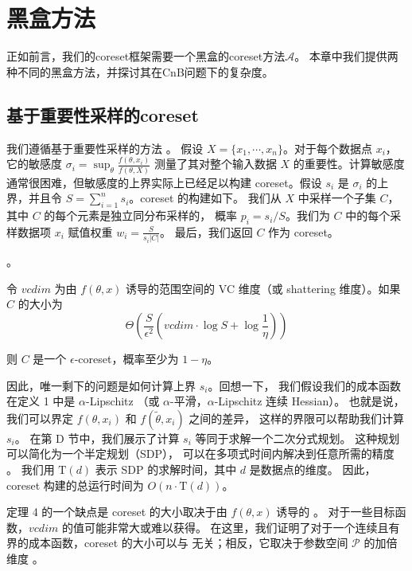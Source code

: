 \chapter{黑盒方法}

正如前言，我们的coreset框架需要一个黑盒的coreset方法$\mathcal{A}$。
本章中我们提供两种不同的黑盒方法，并探讨其在CnB问题下的复杂度。

\section{基于重要性采样的coreset}

我们遵循基于重要性采样的方法 \citep{LS10}。
假设 $X = \{x_1, \cdots, x_n\}$。对于每个数据点 $x_i$，
它的敏感度 $\sigma_i = \sup_\theta \frac{f(\theta, x_i)}{f(\theta, X)}$ 
测量了其对整个输入数据 $X$ 的重要性。计算敏感度通常很困难，但敏感度的上界实际上已经足以构建 
coreset。假设 $s_i$ 是 $\sigma_i$ 的上界，并且令 $S = \sum_{i=1}^n s_i$。coreset 的构建如下。
我们从 $X$ 中采样一个子集 $C$，其中 $C$ 的每个元素是独立同分布采样的，
概率 $p_i = s_i / S$。我们为 $C$ 中的每个采样数据项 $x_i$ 赋值权重 $w_i = \frac{S}{s_i |C|}$。
最后，我们返回 $C$ 作为 coreset。


\begin{theorem}。

令 $vcdim$ 为由 $f(\theta, x)$ 诱导的范围空间的 VC 维度（或 shattering 维度）。如果 $C$ 的大小为
\begin{equation}
\Theta \left( \frac{S}{\epsilon^2} \left( vcdim \cdot \log S + \log \frac{1}{\eta} \right) \right)
\end{equation}

则 $C$ 是一个 $\epsilon$-coreset，概率至少为 $1 - \eta$。
\end{theorem}

因此，唯一剩下的问题是如何计算上界 $s_i$。回想一下，
我们假设我们的成本函数在定义 1 中是 $\alpha$-Lipschitz
（或 $\alpha$-平滑，$\alpha$-Lipschitz 连续 Hessian）。
也就是说，我们可以界定 $f(\theta, x_i)$ 和 $f(\tilde{\theta}, x_i)$ 之间的差异，
这样的界限可以帮助我们计算 $s_i$。
在第 D 节中，我们展示了计算 $s_i$ 等同于求解一个二次分式规划。
这种规划可以简化为一个半定规划（SDP）\citep{BT09}，
可以在多项式时间内解决到任意所需的精度 \citep{GM12}。
我们用 $\text{T}(d)$ 表示 SDP 的求解时间，其中 $d$ 是数据点的维度。
因此，coreset 构建的总运行时间为 $O(n \cdot \text{T}(d))$。

定理 4 的一个缺点是 coreset 的大小取决于由 $f(\theta, x)$ 诱导的 。
对于一些目标函数，$vcdim$ 的值可能非常大或难以获得。
在这里，我们证明了对于一个连续且有界的成本函数，coreset 的大小可以与 无关；相反，它取决于参数空间 $\mathcal{P}$ 的加倍维度 。
